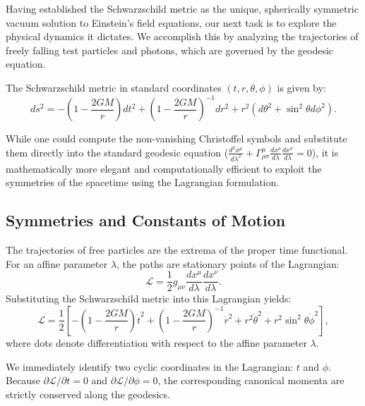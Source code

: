 \documentclass[11pt, a4paper]{report}
\begin{document}
Having established the Schwarzschild metric as the unique, spherically symmetric vacuum solution to Einstein's field equations, our next task is to explore the physical dynamics it dictates. We accomplish this by analyzing the trajectories of freely falling test particles and photons, which are governed by the geodesic equation. 

The Schwarzschild metric in standard coordinates $(t, r, \theta, \phi)$ is given by:
\begin{equation}
\label{eq:schwarzschild_metric_geodesic}
ds^{2} = -\left(1-\frac{2GM}{r}\right)dt^{2} + \left(1-\frac{2GM}{r}\right)^{-1}dr^{2} + r^{2}(d\theta^{2} + \sin^{2}\theta d\phi^{2}).
\end{equation}

While one could compute the non-vanishing Christoffel symbols and substitute them directly into the standard geodesic equation ($\frac{d^{2}x^{\mu}}{d\lambda^{2}} + \Gamma^{\mu}_{\rho\sigma}\frac{dx^{\rho}}{d\lambda}\frac{dx^{\sigma}}{d\lambda} = 0$), it is mathematically more elegant and computationally efficient to exploit the symmetries of the spacetime using the Lagrangian formulation.

\subsection{Symmetries and Constants of Motion}

The trajectories of free particles are the extrema of the proper time functional. For an affine parameter $\lambda$, the paths are stationary points of the Lagrangian:
\begin{equation}
\mathcal{L} = \frac{1}{2} g_{\mu\nu} \frac{dx^{\mu}}{d\lambda} \frac{dx^{\nu}}{d\lambda}.
\end{equation}
Substituting the Schwarzschild metric into this Lagrangian yields:
\begin{equation}
\label{eq:schwarz_lagrangian}
\mathcal{L} = \frac{1}{2} \left[ -\left(1-\frac{2GM}{r}\right)\dot{t}^{2} + \left(1-\frac{2GM}{r}\right)^{-1}\dot{r}^{2} + r^{2}\dot{\theta}^{2} + r^{2}\sin^{2}\theta \dot{\phi}^{2} \right],
\end{equation}
where dots denote differentiation with respect to the affine parameter $\lambda$.

We immediately identify two cyclic coordinates in the Lagrangian: $t$ and $\phi$. Because $\partial\mathcal{L}/\partial t = 0$ and $\partial\mathcal{L}/\partial \phi = 0$, the corresponding canonical momenta are strictly conserved along the geodesics. 
\end{document}
